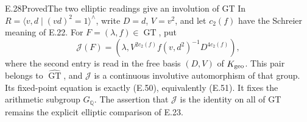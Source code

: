 \begin{result}{E.28}{Proved}{The two elliptic readings give an involution of GT}
In $R=\langle v,d\mid(vd)^2=1\rangle^{\wedge}$,
write $D=d$, $V=v^2$, and let $c_2(f)$ have the
Schreier meaning of E.22.  For
$F=(\lambda,f)\in\widehat{\operatorname{GT}}$, put
\[
 \mathcal J(F)=\left(\lambda,
       V^{2c_2(f)}f(v,d^2)^{-1}D^{4c_2(f)}\right),        \tag{E.72}
\]
where the second entry is read in the free basis
$(D,V)$ of $K_{\rm geo}$.
This pair belongs to $\widehat{\operatorname{GT}}$,
and $\mathcal J$ is a continuous involutive
automorphism of that group.  Its fixed-point
equation is exactly (E.50), equivalently (E.51).
It fixes the arithmetic subgroup $G_{\mathbb Q}$.
The assertion that $\mathcal J$ is the identity
on all of GT remains the explicit elliptic
comparison of E.23.
\end{result}
